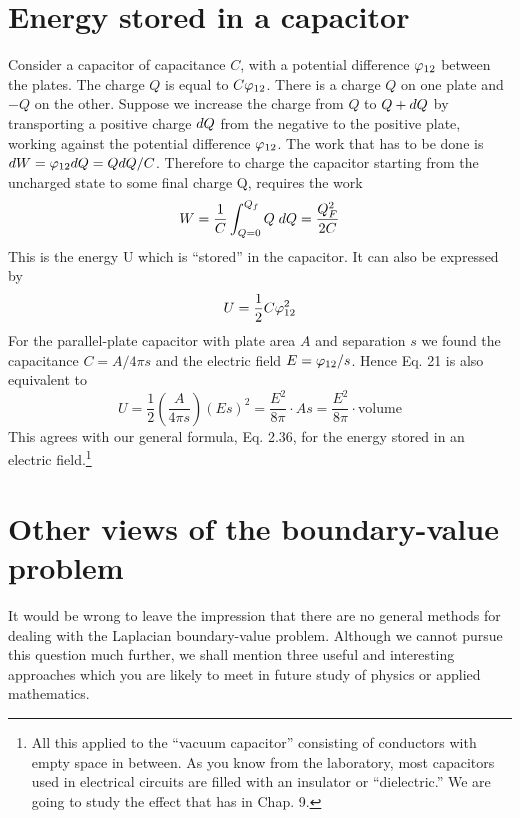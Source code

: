 \section{Energy stored in a capacitor}

Consider a capacitor of capacitance $C$, with a potential difference
$\varphi_{12}$ between the plates. The charge $Q$ is equal to $C\varphi_{12}$. There is a
charge $Q$ on one plate and $-Q$ on the other. Suppose we increase
the charge from $Q$ to $Q + d Q$ by transporting a positive charge $d Q$
from the negative to the positive plate, working against the potential
difference $\varphi_{12}$. The work that has to be done is 
$d W = \varphi_{12} d Q = Q d Q/C$.
Therefore to charge the capacitor starting from the uncharged
state to some final charge Q, requires the work
\begin{equation}
  W = \frac{1}{C}\int_{Q=0}^{Q_f} Q\;d Q = \frac{Q_F^2}{2C}
\end{equation}
This is the energy U which is ``stored'' in the capacitor. It can also
be expressed by
\begin{equation}
  U = \frac{1}{2}C\varphi_{12}^2
\end{equation}
For the parallel-plate capacitor with plate area $A$ and separation $s$
we found the capacitance $C = A /4\pi s$ and the electric field $E = \varphi_{12}/s$.
Hence Eq. 21 is also equivalent to
\begin{equation}
  U = \frac{1}{2}\left(\frac{A}{4\pi s}\right)(Es)^2 = \frac{E^2}{8\pi}\cdot As 
     = \frac{E^2}{8\pi}\cdot\text{volume}
\end{equation}
This agrees with our general formula, Eq. 2.36, for the energy stored
in an electric field.\footnote{All this applied to
the ``vacuum capacitor'' consisting of conductors with empty space
in between. As you know from the laboratory, most capacitors used in electrical circuits
are filled with an insulator or ``dielectric.'' We are going to study the effect that has in
Chap. 9.}

\section{Other views of the boundary-value problem}

It would be wrong to leave the impression that there are no general
methods for dealing with the Laplacian boundary-value problem.
Although we cannot pursue this question much further, we
shall mention three useful and interesting approaches which you are
likely to meet in future study of physics or applied mathematics.

